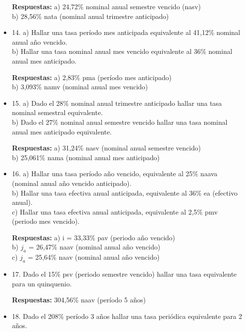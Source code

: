 \begin{itemize}
       \textbf{Respuestas:} a) 24,72\% nominal anual semestre vencido (nasv)\\
     b) 28,56\%  nata (nominal anual trimestre anticipado)
       \medskip

 \item 14.  a) Hallar una tasa período mes anticipada equivalente al 41,12\% nominal anual año vencido.\\
  b) Hallar una tasa nominal anual mes vencido equivalente al 36\% nominal anual mes anticipado.
  
       \textbf{Respuestas:} a) 2,83\%  pma (período mes anticipado)\\
         b) 3,093\%  namv (nominal anual mes vencido)
       \medskip

 \item 15. a) Dado el 28\% nominal anual trimestre anticipado hallar una tasa nominal semestral equivalente.\\
 b) Dado el 27\% nominal anual semestre vencido hallar una tasa nominal anual mes anticipado equivalente.
 
       \textbf{Respuestas:} a) 31,24\%  nasv (nominal anual semestre vencido)\\
        b) 25,061\%  nama (nominal anual mes anticipado)
       \medskip

 \item 16. a) Hallar una tasa período año vencido, equivalente al 25\%  naava (nominal anual año vencido anticipado).\\
    b) Hallar una tasa efectiva anual anticipada, equivalente al 36\% ea (efectivo anual). \\
    c) Hallar una tasa efectiva anual anticipada, equivalente al 2,5\% pmv (periodo mes vencido).
    
       \textbf{Respuestas:} a) i = 33,33\%  pav (periodo año vencido)\\
         b) $j_{a}$ = 26,47\%  naav (nominal anual año vencido)\\
         c) $j_{a}$ = 25,64\%  naav (nominal anual año vencido)
       \medskip

 \item 17. Dado el 15\% psv (periodo semestre vencido) hallar una tasa equivalente para un quinquenio.
 
       \textbf{Respuestas:} 304,56\% naav (período 5 años) 
       \medskip

 \item 18. Dado el 208\% período 3 años hallar una tasa periódica equivalente para 2 años.
 

\end{itemize}
